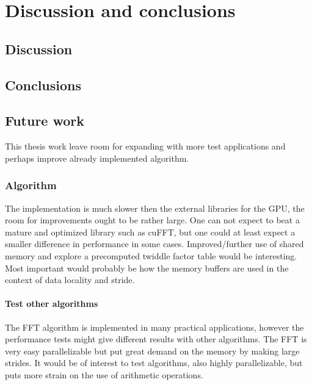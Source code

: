 \chapter{Discussion and conclusions}


\section{Discussion}


\section{Conclusions}


\section{Future work}

This thesis work leave room for expanding with more test applications and perhaps improve already implemented algorithm.

\subsection{Algorithm}

The implementation is much slower then the external libraries for the GPU, the room for improvements ought to be rather large. One can not expect to beat a mature and optimized library such as cuFFT, but one could at least expect a smaller difference in performance in some cases. Improved/further use of shared memory and explore a precomputed twiddle factor table would be interesting. Most important would probably be how the memory buffers are used in the context of data locality and stride.

\subsubsection{Test other algorithms}

The FFT algorithm is implemented in many practical applications, however the performance tests might give different results with other algorithms. The FFT is very easy parallelizable but put great demand on the memory by making large strides. It would be of interest to test algorithms, also highly parallelizable, but puts more strain on the use of arithmetic operations.

